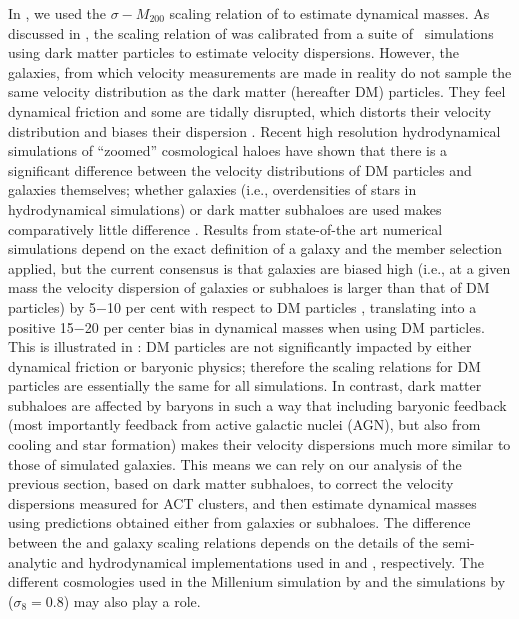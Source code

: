 In \cite{sifon13}, we used the $\sigma-M_{200}$ scaling relation of \cite{evrard08} to estimate 
dynamical masses. As discussed in , the scaling relation of \cite{evrard08} was 
calibrated from a suite of \Nbody\ simulations using dark matter particles to estimate velocity 
dispersions. However, the galaxies, from which velocity measurements are made in reality do not 
sample the same velocity distribution as the dark matter (hereafter DM) particles. They feel 
dynamical friction and some are tidally disrupted, which distorts their velocity distribution and 
biases their dispersion \citep[e.g.,][]{carlberg94,colin00}. Recent high resolution hydrodynamical 
simulations of ``zoomed'' cosmological haloes have shown that there is a significant difference 
between the velocity distributions of DM particles and galaxies themselves; whether galaxies 
(i.e., overdensities of stars in hydrodynamical simulations) or dark matter subhaloes are used 
makes comparatively little difference \citep{munari13}. Results from state-of-the art numerical 
simulations depend on the exact definition of a galaxy and the member selection applied, but the 
current consensus is that galaxies are biased high (i.e., at a given mass the velocity dispersion 
of galaxies or subhaloes is larger than that of DM particles) by 5$-$10 per cent with respect to DM 
particles \citep{lau10,munari13,wu13}, translating into a positive 15$-$20 per center bias in 
dynamical masses when using DM particles. This is illustrated in : DM 
particles are not significantly impacted by either dynamical friction or baryonic physics; 
therefore the scaling relations for DM particles are essentially the same for all simulations. In 
contrast, dark matter subhaloes are affected by baryons in such a way that including baryonic 
feedback (most importantly feedback from active galactic nuclei (AGN), but also from cooling and 
star formation) makes their velocity dispersions much more similar to those of simulated galaxies. 
This means we can rely on our analysis of the previous section, based on dark matter subhaloes, to 
correct the velocity dispersions measured for ACT clusters, and then estimate dynamical masses 
using predictions obtained either from galaxies or subhaloes. The difference between the 
\cite{saro13} and \cite{munari13} galaxy scaling relations depends on the details of the 
semi-analytic and hydrodynamical implementations used in \cite{saro13} and \cite{munari13}, 
respectively. The different cosmologies used in the Millenium simulation \citep[in particular, 
$\sigma_8=0.9$;][]{springel05_millenium} by \cite{saro13} and the simulations by \cite{munari13} 
($\sigma_8=0.8$) may also play a role.

